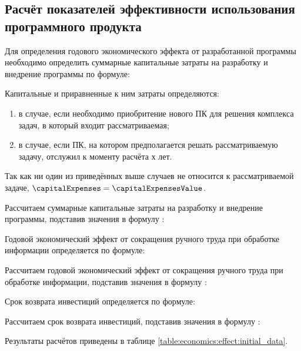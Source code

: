 \subsection{Расчёт показателей эффективности использования программного продукта}
\label{sec:economics:efficiency}

Для определения годового экономического эффекта от разработанной программы необходимо определить суммарные капитальные затраты на разработку и внедрение программы по формуле:
\totalCapitalExpensesEquation

Капитальные и приравненные к ним затраты определяются:
\begin{enumerate}
	\item в случае, если необходимо приобритение нового ПК для решения комплекса задач, в который входит рассматриваемая;
	\item в случае, если ПК, на котором предполагается решать рассматриваемую задачу, отслужил к моменту расчёта х лет.
\end{enumerate}

Так как ни один из приведённых выше случаев не относится к рассматриваемой задаче, \(\capitalExpenses = \capitalExpensesValue\).

Рассчитаем суммарные капитальные затраты на разработку и внедрение программы, подставив значения в формулу :
\totalCapitalExpensesFormulaApplied

Годовой экономический эффект от сокращения ручного труда при обработке информации определяется по формуле:
\annualEconomicEffectEquation

Рассчитаем годовой экономический эффект от сокращения ручного труда при обработке информации, подставив значения в формулу :
\annualEconomicEffectFormulaApplied

Срок возврата инвестиций определяется по формуле:
\investmentMoneyReturnTimeEquation

Рассчитаем срок возврата инвестиций, подставив значения в формулу :
\investmentMoneyReturnTimeFormulaApplied

Результаты расчётов приведены в таблице \ref{table:economics:effect:initial_data}.

